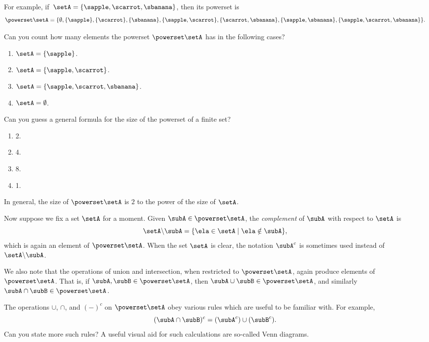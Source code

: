 For example, if~$\setA = \{ \sapple, \scarrot, \sbanana \}$, then its powerset is
\begin{equation*}
    \powerset \setA = \{ \emptyset, \{ \sapple \}, \{ \scarrot \}, \{ \sbanana\}, \{ \sapple, \scarrot \}, \{ \scarrot, \sbanana \}, \{ \sapple, \sbanana\}, \{ \sapple, \scarrot, \sbanana \} \}.
\end{equation*}

\begin{exercise}
Can you count how many elements the powerset $\powerset \setA$ has in the following cases? 
\begin{enumerate}
\item $\setA = \{ \sapple \} $. 
\item $\setA = \{ \sapple, \scarrot \} $.
\item $\setA = \{ \sapple, \scarrot, \sbanana \} $. 
\item $\setA = \emptyset $. 
\end{enumerate}
Can you guess a general formula for the size of the powerset of a finite set? 
\end{exercise}

\begin{solution}
\begin{enumerate}
\item 2. 
\item 4. 
\item 8.
\item 1. 
\end{enumerate}
In general, the size of $\powerset \setA$ is $2$ to the power of the size of $\setA$. 
\end{solution}

Now suppose we fix a set $\setA$ for a moment. Given $\subA \in \powerset \setA$, the \emph{complement} of $\subA$ with respect to $\setA$ is
\begin{equation}
\setA \backslash \subA = \{ \ela \in \setA \mid \ela \notin \subA \},
\end{equation}
which is again an element of $\powerset \setA$. 
When the set $\setA$ is clear, the notation $\subA^c$ is sometimes used instead of $\setA \backslash \subA$. 

We also note that the operations of union and intersection, when restricted to $\powerset \setA$, again produce elements of $\powerset \setA$. That is, if $\subA, \subB \in \powerset \setA$, then $\subA \cup \subB \in \powerset \setA$, and similarly $\subA \cap \subB \in \powerset \setA$. 

The operations $\cup$, $\cap$, and $( - )^c$ on $\powerset \setA$ obey various rules which are useful to be familiar with. For example, 
\begin{equation}
(\subA \cap \subB)^c = (\subA^c) \cup (\subB^c).
\end{equation}
Can you state more such rules? 
A useful visual aid for such calculations are so-called Venn diagrams. 

